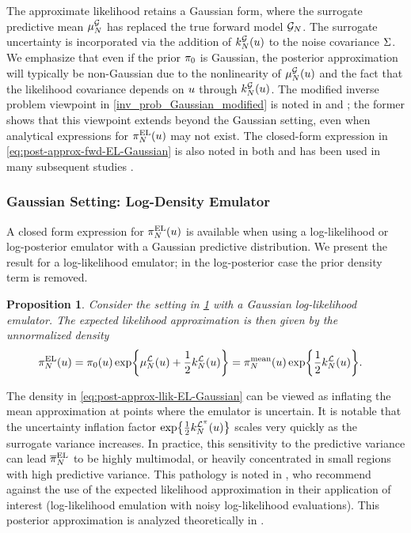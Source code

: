 \documentclass[12pt]{article}
\newtheorem{prop}{Proposition}
\begin{document}
The approximate likelihood retains a Gaussian form, where the surrogate predictive mean
$\emMean[\Ndesign]{\fwd}$ has replaced the true forward model $\fwdEm[\Ndesign]$. The surrogate uncertainty
is incorporated via the addition of $\emKer[\Ndesign]{\fwd}(\Par)$ to the noise covariance $\likPar$.
We emphasize that even if the prior $\priorDens$ is Gaussian, the posterior approximation will typically be non-Gaussian
due to the nonlinearity of $\emMean[\Ndesign]{\fwd}(\Par)$ and the fact that the likelihood covariance depends on 
$\Par$ through $\emKer[\Ndesign]{\fwd}(\Par)$. The modified inverse problem viewpoint 
in \cref{inv_prob_Gaussian_modified} is noted in \citet{SinsbeckNowak} and \citet{StuartTeck1}; the former shows that
this viewpoint extends beyond the Gaussian setting, even when analytical expressions for $\postApproxMarg[\Ndesign](\Par) $ 
may not exist.
The closed-form expression in \cref{eq:post-approx-fwd-EL-Gaussian} is also noted in both
\citet{SinsbeckNowak, StuartTeck1} and has been used in many subsequent studies 
\citep{VehtariParallelGP,weightedIVAR,StuartTeck2,GP_PDE_priors,CES,idealizedGCM,
villani2024posteriorsamplingadaptivegaussian,hydrologicalModel}. 

\subsubsection{Gaussian Setting: Log-Density Emulator}
A closed form expression for $\postApproxMarg[\Ndesign](\Par)$ is available when using a log-likelihood
or log-posterior emulator with a Gaussian predictive distribution. We present the result for a log-likelihood 
emulator; in the log-posterior case the prior density term is removed.

\begin{prop} \label{prop:llik-em-Gaussian}
Consider the setting in \cref{prop:llik-em-Gaussian} with a Gaussian log-likelihood emulator. The 
expected likelihood approximation is then given by the unnormalized density 
\begin{align}
\postApproxMarg[\Ndesign](\Par) 
&= \priorDens(\Par) \Exp{\emMean[\Ndesign]{\llik}(\Par) + \frac{1}{2}\emKer[\Ndesign]{\llik}(\Par)}
= \postApproxMean(\Par) \Exp{\frac{1}{2}\emKer[\Ndesign]{\llik}(\Par)}. \label{eq:post-approx-llik-EL-Gaussian}
\end{align}
\end{prop}

The density in \cref{eq:post-approx-llik-EL-Gaussian} can be viewed as inflating the mean approximation 
at points where the emulator is uncertain. 
It is notable that the uncertainty inflation factor $\Exp{\frac{1}{2}\emKer[\Ndesign]{\lpost}(\Par)}$ scales 
very quickly as the surrogate variance increases.
In practice, this sensitivity to the predictive variance can lead $\postApproxNormMarg[\Ndesign]$ to be highly 
multimodal, or heavily concentrated in small regions with high predictive variance. 
This pathology is noted in \cite{VehtariParallelGP}, who recommend against the use of the expected
likelihood approximation in their application of interest (log-likelihood emulation with noisy log-likelihood evaluations). 
This posterior approximation is analyzed theoretically in \citet{StuartTeck1,StuartTeck2,GP_PDE_priors,random_fwd_models,TeckHyperpar}.
\end{document}
